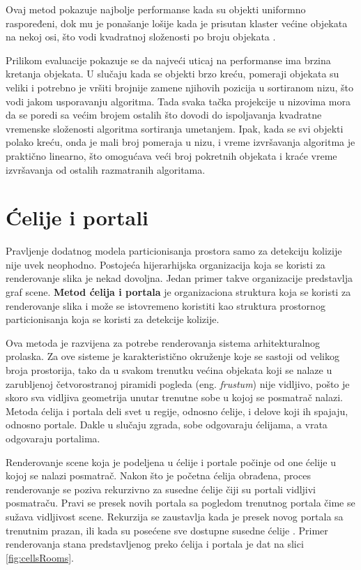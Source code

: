 \documentclass[12pt,oneside]{memoir}
\begin{document}
Ovaj metod pokazuje najbolje performanse kada su objekti uniformno raspoređeni, dok mu je ponašanje lošije kada je
prisutan klaster većine objekata na nekoj osi, što vodi kvadratnoj složenosti po broju objekata \cite{glavna2}.

Prilikom evaluacije pokazuje se da najveći uticaj na performanse ima brzina kretanja objekata.
U slučaju kada se objekti brzo kreću, pomeraji objekata su veliki i potrebno je vršiti brojnije zamene njihovih pozicija u sortiranom nizu,
što vodi jakom usporavanju algoritma.
Tada svaka tačka projekcije u nizovima mora 
da se poredi sa većim brojem ostalih što dovodi do ispoljavanja kvadratne vremenske složenosti algoritma sortiranja umetanjem.
Ipak, kada se svi objekti polako kreću, onda je mali broj pomeraja u nizu, i vreme izvršavanja algoritma je praktično 
linearno, što omogućava veći broj pokretnih objekata i kraće vreme izvršavanja od ostalih razmatranih algoritama.

\section{Ćelije i portali}
\label{subsec:cells}

Pravljenje dodatnog modela particionisanja prostora samo za detekciju kolizije nije uvek neophodno.
Postojeća hijerarhijska organizacija koja se koristi za renderovanje slika je nekad dovoljna.
Jedan primer takve organizacije predstavlja graf scene.
\textbf{Metod ćelija i portala}  je organizaciona struktura koja se koristi za renderovanje slika
i može se istovremeno koristiti kao struktura prostornog particionisanja koja se koristi za detekcije kolizije.

Ova metoda je razvijena za potrebe renderovanja sistema arhitekturalnog prolaska. 
Za ove sisteme je karakteristično okruženje koje se sastoji od velikog broja prostorija, tako da u svakom trenutku
većina objekata koji se nalaze u zarubljenoj četvorostranoj piramidi pogleda (eng. {\em frustum})
nije vidljivo, pošto je skoro sva vidljiva geometrija unutar trenutne sobe u kojoj se posmatrač nalazi.
Metoda ćelija i portala deli svet u regije, odnosno ćelije, i delove koji ih spajaju, odnosno portale.
Dakle u slučaju zgrada, sobe odgovaraju ćelijama, a vrata odgovaraju portalima. 

Renderovanje scene koja je podeljena u ćelije i portale počinje od one ćelije u kojoj se nalazi posmatrač. 
Nakon što je početna ćelija obrađena, proces renderovanje se poziva rekurzivno
za susedne ćelije čiji su portali vidljivi posmatraču. 
Pravi se presek novih portala sa pogledom trenutnog portala čime se sužava vidljivost scene.
Rekurzija se zaustavlja kada je presek novog portala sa trenutnim prazan, ili kada su posećene sve dostupne susedne ćelije \cite{glavnaKnjiga}.
Primer renderovanja stana predstavljenog preko ćelija i portala je dat na slici \ref{fig:cellsRooms}.
\end{document}
